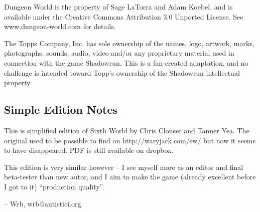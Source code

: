 Dungeon World is the property of Sage LaTorra and Adam Koebel, and is available under the Creative Commons Attribution 3.0 Unported License. See www.dungeon-world.com for details.

The Topps Company, Inc. has sole ownership of the names, logo, artwork, marks, photographs, sounds, audio, video and/or any proprietary material used in connection with the game Shadowrun. This is a fan-created adaptation, and no challenge is intended toward Topp’s ownership of the Shadowrun intellectual property.

\subsection{Simple Edition Notes}

This is simplified edition of Sixth World by Chris Clouser and Tanner Yea. The original used to be possible to find on http://waryjack.com/sw/ but now it seems to have disappeared. PDF is still available on dropbox.

This edition is very similar however – I see myself more as an editor and final beta-tester than new autor, and I aim to make the game (already excellent before I got to it) “production quality”.

– Wrb, wrb@autistici.org